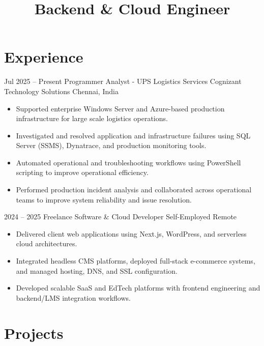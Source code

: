 \documentclass[10pt, a4paper, sans]{moderncv}
\title{Backend \& Cloud Engineer}
\begin{document}

\makecvtitle
\vspace*{-8mm}

\section{Experience}

\cventry
  {Jul 2025 -- Present}
  {Programmer Analyst - UPS Logistics Services}
  {Cognizant Technology Solutions}
  {Chennai, India}
  {}
  {
  \begin{itemize}\setlength{\itemsep}{2pt}
    \item Supported enterprise Windows Server and Azure-based production infrastructure for large scale logistics operations.
    \item Investigated and resolved application and infrastructure failures using SQL Server (SSMS), Dynatrace, and production monitoring tools.
    \item Automated operational and troubleshooting workflows using PowerShell scripting to improve operational efficiency.
    \item Performed production incident analysis and collaborated across operational teams to improve system reliability and issue resolution.
  \end{itemize}
  }

\vspace{1mm}

\cventry
  {2024 -- 2025}
  {Freelance Software \& Cloud Developer}
  {Self-Employed}
  {Remote}
  {}
  {
  \begin{itemize}\setlength{\itemsep}{2pt}
    \item Delivered client web applications using Next.js, WordPress, and serverless cloud architectures.
    \item Integrated headless CMS platforms, deployed full-stack e-commerce systems, and managed hosting, DNS, and SSL configuration.
    \item Developed scalable SaaS and EdTech platforms with frontend engineering and backend/LMS integration workflows.
  \end{itemize}
  }

\section{Projects}
\end{document}

